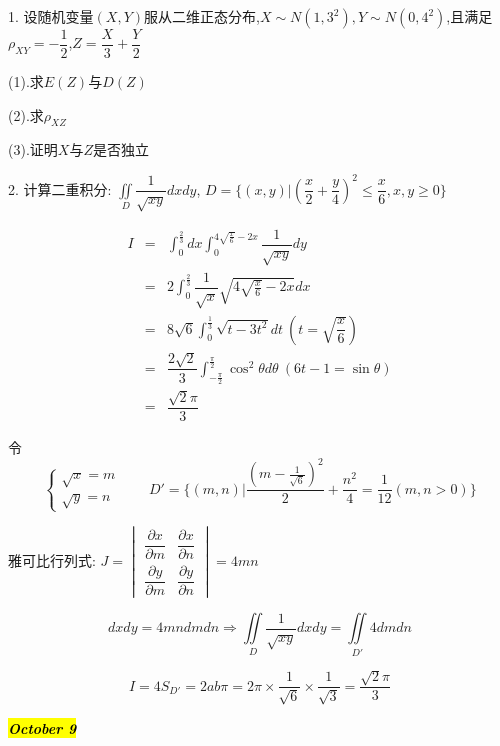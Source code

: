 1. 设随机变量$(X,Y)$服从二维正态分布,$X\sim N(1,3^2),Y\sim N(0,4^2)$,且满足$\rho_{XY}=-\dfrac{1}{2}$,$Z=\dfrac{X}{3}+\dfrac{Y}{2}$

(1).求$E(Z)$与$D(Z)$

(2).求$\rho_{XZ}$

(3).证明$X$与$Z$是否独立
\begin{solution}
	
\end{solution}


2. 计算二重积分: $\displaystyle{\iint\limits_{D}\dfrac{1}{\sqrt{xy}}dxdy}$, $D = \{(x,y)|(\dfrac{x}{2}+\dfrac{y}{4})^2\leq \dfrac{x}{6},x,y\geq 0\}$
\begin{solution}
	\begin{eqnarray*}
		I & = & \int_{0}^{\frac{2}{3}}dx\int_{0}^{4\sqrt{\frac{x}{6}}-2x}\dfrac{1}{\sqrt{xy}}dy\\
		  & = & 2\int_{0}^{\frac{2}{3}}\dfrac{1}{\sqrt{x}}\sqrt{4\sqrt{\frac{x}{6}}-2x}dx\\
		  & = & 8\sqrt{6}\int_{0}^{\frac{1}{3}}\sqrt{t-3t^2}dt\ (t=\sqrt{\dfrac{x}{6}})\\
		  & = & \dfrac{2\sqrt{2}}{3}\int_{-\frac{\pi}{2}}^{\frac{\pi}{2}}\cos^2\theta d\theta\ (6t-1=\sin\theta)\\
		  & = & \dfrac{\sqrt{2}\pi}{3}
	\end{eqnarray*}
\end{solution}
\begin{anymark}[注]
	令 
	$$\begin{cases}
		\sqrt{x} = m \\
		\sqrt{y} = n
	\end{cases} \quad \quad 
	D' = \{(m,n) |\dfrac{(m-\frac{1}{\sqrt{6}})^2}{2}+\dfrac{n^2}{4}=\dfrac{1}{12}(m,n>0)\}$$
	
	雅可比行列式: $J = 
	\begin{vmatrix}
		\dfrac{\partial x}{\partial m} & \dfrac{\partial x}{\partial n} \\
		\dfrac{\partial y}{\partial m} & \dfrac{\partial y}{\partial n}
	\end{vmatrix} = 4mn$

	$$dxdy = 4mndmdn\Rightarrow \iint\limits_{D}\dfrac{1}{\sqrt{xy}}dxdy = \iint\limits_{D'}4dmdn$$
	
	$$I = 4S_{D'} = 2ab\pi = 2\pi\times\dfrac{1}{\sqrt{6}}\times\dfrac{1}{\sqrt{3}}=\dfrac{\sqrt{2}\pi}{3}$$
\end{anymark}

\hl{\textbf{\textit{October 9}}}


